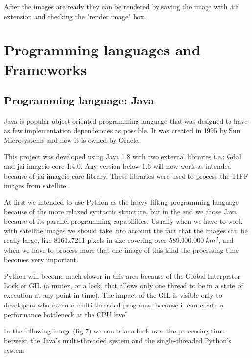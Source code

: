 \documentclass[12pt, a4paper]{report}
\begin{document}
After the images are ready they can be rendered by saving the image with .tif extension and checking the "render image" box.



\section{Programming languages and Frameworks} 

\subsection{Programming language: Java}
\medskip

\quad
Java is popular object-oriented programming language that was designed to have as few implementation dependencies as possible. It was created in 1995 by Sun Microsystems and now it is owned by Oracle.
\par

This project was developed using Java 1.8 with two external libraries i.e.: Gdal and jai-imageio-core 1.4.0. Any version below 1.6 will now work as intended because of jai-imageio-core library. These libraries were used to process the TIFF images from satellite.
\par

At first we intended to use Python as the heavy lifting programming language because of the more relaxed syntactic structure, but in the end we chose Java because of its parallel programming capabilities. Usually when we have to work with satellite images we should take into account the fact that the images can be really large, like 8161x7211 pixels in size covering over 589.000.000 $km^2$, and when we have to process more that one image of this kind the processing time becomes very important.
\par

Python will become much slower in this area because of the Global Interpreter Lock or GIL (a mutex, or a lock, that allows only one thread to be in a state of execution at any point in time). The impact of the GIL is visible only to developers who execute multi-threaded programs, because it can create a performance bottleneck at the CPU level.
 \par
 
\bigskip

In the following image (fig 7) we can take a look over the processing time between the Java's multi-threaded system and the single-threaded Python's system
\par
\end{document}

